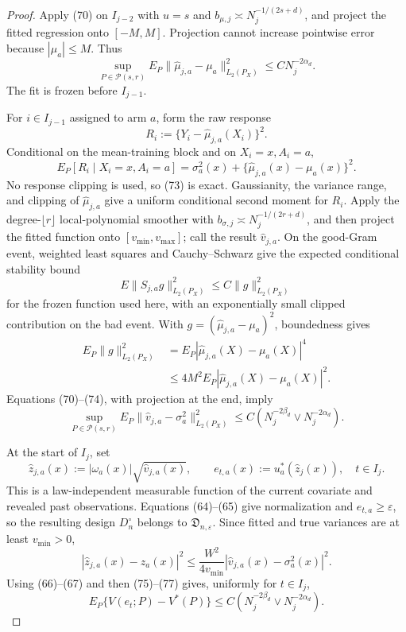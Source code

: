\documentclass{article}
\begin{document}
\begin{proof}
Apply (70) on \(I_{j-2}\) with \(u=s\) and \(b_{\mu,j}\asymp N_j^{-1/(2s+d)}\), and project the fitted regression onto \([-M,M]\). Projection cannot increase pointwise error because \(|\mu_a|\leq M\). Thus
\[
\sup_{P\in\mathcal P(s,r)}
E_P\|\widehat\mu_{j,a}-\mu_a\|_{L_2(P_X)}^2
\leq C N_j^{-2\alpha_d}.
\tag{71}
\]
The fit is frozen before \(I_{j-1}\).

For \(i\in I_{j-1}\) assigned to arm \(a\), form the raw response
\[
R_i:=\{Y_i-\widehat\mu_{j,a}(X_i)\}^2.
\tag{72}
\]
Conditional on the mean-training block and on \(X_i=x,A_i=a\),
\[
E_P[R_i\mid X_i=x,A_i=a]
=\sigma_a^2(x)+\{\widehat\mu_{j,a}(x)-\mu_a(x)\}^2.
\tag{73}
\]
No response clipping is used, so (73) is exact. Gaussianity, the variance range, and clipping of \(\widehat\mu_{j,a}\) give a uniform conditional second moment for \(R_i\). Apply the degree-\(\lfloor r\rfloor\) local-polynomial smoother with \(b_{\sigma,j}\asymp N_j^{-1/(2r+d)}\), and then project the fitted function onto \([v_{\min},v_{\max}]\); call the result \(\widehat v_{j,a}\). On the good-Gram event, weighted least squares and Cauchy--Schwarz give the expected conditional stability bound
\[
E\|S_{j,a}g\|_{L_2(P_X)}^2
\leq C\|g\|_{L_2(P_X)}^2
\]
for the frozen function used here, with an exponentially small clipped contribution on the bad event. With \(g=(\widehat\mu_{j,a}-\mu_a)^2\), boundedness gives
\[
\begin{aligned}
E_P\|g\|_{L_2(P_X)}^2
&=E_P|\widehat\mu_{j,a}(X)-\mu_a(X)|^4\\
&\leq4M^2E_P|\widehat\mu_{j,a}(X)-\mu_a(X)|^2.
\end{aligned}
\tag{74}
\]
Equations (70)--(74), with projection at the end, imply
\[
\sup_{P\in\mathcal P(s,r)}
E_P\|\widehat v_{j,a}-\sigma_a^2\|_{L_2(P_X)}^2
\leq C\left(N_j^{-2\beta_d}\vee N_j^{-2\alpha_d}\right).
\tag{75}
\]

At the start of \(I_j\), set
\[
\widehat z_{j,a}(x):=|\omega_a(x)|\sqrt{\widehat v_{j,a}(x)},
\qquad
e_{t,a}(x):=u_a^*(\widehat z_j(x)),
\quad t\in I_j.
\tag{76}
\]
This is a law-independent measurable function of the current covariate and revealed past observations. Equations (64)--(65) give normalization and \(e_{t,a}\geq\varepsilon\), so the resulting design \(D_n^{\circ}\) belongs to \(\mathfrak D_{n,\varepsilon}\). Since fitted and true variances are at least \(v_{\min}>0\),
\[
|\widehat z_{j,a}(x)-z_a(x)|^2
\leq\frac{W^2}{4v_{\min}}
|\widehat v_{j,a}(x)-\sigma_a^2(x)|^2.
\tag{77}
\]
Using (66)--(67) and then (75)--(77) gives, uniformly for \(t\in I_j\),
\[
E_P\{V(e_t;P)-V^*(P)\}
\leq C\left(N_j^{-2\beta_d}\vee N_j^{-2\alpha_d}\right).
\tag{78}
\]


\end{proof}
\end{document}

